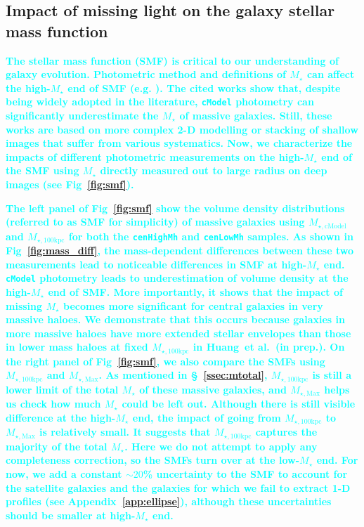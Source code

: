 \documentclass[fleqn,usenatbib]{mnras}
\def\etal{{\ et al.~}}
\def\cmodel{\texttt{cModel}}
\def\rbcg{\texttt{cenHighMh}}
\def\nbcg{\texttt{cenLowMh}}
\def\mstar{{$M_{\star}$}}
\def\mtot{{$M_{\star,100\mathrm{kpc}}$}}
\def\mmax{{$M_{\star,\mathrm{Max}}$}}
\def\mcmodel{{$M_{\star,\mathrm{cModel}}$}}
\newcommand{\song}[1]{\textcolor{cyan}{\textbf{#1}}}
\begin{document}
\subsection{Impact of missing light on the galaxy stellar mass function}
    \label{ssec:smf}
    
    \song{
    The stellar mass function (SMF) is critical to our understanding of 
    galaxy evolution.
    Photometric method and definitions of \mstar{} can affect the 
    high-\mstar{} end of SMF (e.g. \citealt{Bernardi2013, dSouza2015, Bernardi2017}). 
    The cited works show that, despite being widely adopted in the literature, 
    \cmodel{} photometry can significantly underestimate the \mstar{} of massive 
    galaxies. 
    Still, these works are based on more complex 2-D modelling or stacking of 
    shallow images that suffer from various systematics.
    Now, we characterize the impacts of different photometric measurements on the 
    high-\mstar{} end of the SMF using \mstar{} directly measured out to large 
    radius on deep images (see Fig~\ref{fig:smf}).
    }
    
    \song{
    The left panel of Fig~\ref{fig:smf} show the volume density distributions 
    (referred to as SMF for simplicity) of massive galaxies using \mcmodel{} 
    and \mtot{} for both the \rbcg{} and \nbcg{} samples.  
    As shown in Fig~\ref{fig:mass_diff}, the mass-dependent differences between these
    two measurements lead to noticeable differences in SMF at high-\mstar{} end.
    \cmodel{} photometry leads to underestimation of volume density at the 
    high-\mstar{} end of SMF. 
    More importantly, it shows that the impact of missing \mstar{} becomes more 
    significant for central galaxies in very massive haloes. 
    We demonstrate that this occurs because galaxies in more massive haloes 
    have more extended stellar envelopes than those in lower mass haloes at fixed 
    \mtot{} in Huang\etal (in prep.).
    On the right panel of Fig~\ref{fig:smf}, we also compare the SMFs using \mtot{} 
    and \mmax{}. 
    As mentioned in \S~\ref{ssec:mtotal}, \mtot{} is still a lower limit of the total 
    \mstar{} of these massive galaxies, and \mmax{} helps us check how much \mstar{} 
    could be left out.  
    Although there is still visible difference at the high-\mstar{} end, the impact
    of going from \mtot{} to \mmax{} is relatively small. 
    It suggests that \mtot{} captures the majority of the total \mstar{}.
    Here we do not attempt to apply any completeness correction, so the SMFs turn 
    over at the low-\mstar{} end. 
    For now, we add a constant ${\sim}20$\% uncertainty to the SMF to account for 
    the satellite galaxies and the galaxies for which we fail to extract 1-D profiles 
    (see Appendix~\ref{app:ellipse}), although these uncertainties should be smaller 
    at high-\mstar{} end. 
    }     
\end{document}
